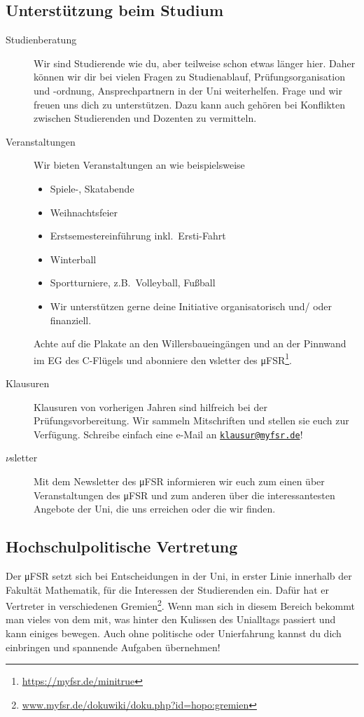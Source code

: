 \documentclass{scrartcl}
\begin{document}
\subsection*{Unterstützung beim Studium}
\label{sub:unterstutzung_beim_studium}
\begin{description}
  \item[Studienberatung] Wir sind Studierende wie du, aber teilweise schon etwas länger hier.
    Daher können wir dir bei vielen Fragen zu Studienablauf, Prüfungsorganisation und -ordnung, Ansprechpartnern in der Uni weiterhelfen.
    Frage und wir freuen uns dich zu unterstützen.
    Dazu kann auch gehören bei Konflikten zwischen Studierenden und Dozenten zu vermitteln.
  \item[Veranstaltungen] Wir bieten Veranstaltungen an wie beispielsweise
    \begin{itemize}
      \item Spiele-, Skatabende
      \item Weihnachtsfeier
      \item Erstsemestereinführung inkl.\ Ersti-Fahrt
      \item Winterball
      \item Sportturniere, z.B.\ Volleyball, Fußball
      \item Wir unterstützen gerne deine Initiative organisatorisch und/ oder finanziell.
    \end{itemize}
    Achte auf die Plakate an den Willersbaueingängen und an der Pinnwand im EG des C-Flügels und
    abonniere den νsletter des μFSR\footnote{\url{https://myfsr.de/minitrue}}.
  \item[Klausuren] Klausuren von vorherigen Jahren sind hilfreich bei der Prüfungsvorbereitung.
    Wir sammeln Mitschriften und stellen sie euch zur Verfügung.
    Schreibe einfach eine e-Mail an \href{mailto:klausur@myfsr.de}{\nolinkurl{klausur@myfsr.de}}!
  \item[$\nu$sletter] Mit dem Newsletter des μFSR informieren wir euch zum einen über
    Veranstaltungen des μFSR und zum anderen über die interessantesten Angebote der Uni,
    die uns erreichen oder die wir finden.
\end{description}

\subsection*{Hochschulpolitische Vertretung}
\label{sub:hochschulpolitische_vertretung}
Der μFSR setzt sich bei Entscheidungen in der Uni, in erster Linie innerhalb der Fakultät Mathematik,
für die Interessen der Studierenden ein.
Dafür hat er Vertreter in verschiedenen Gremien\footnote{\url{www.myfsr.de/dokuwiki/doku.php?id=hopo:gremien}}.
Wenn man sich in diesem Bereich  bekommt man vieles von dem mit, was hinter den Kulissen
des Unialltags passiert und kann einiges bewegen.
Auch ohne politische oder Unierfahrung kannst du dich einbringen und spannende Aufgaben übernehmen!
\end{document}
